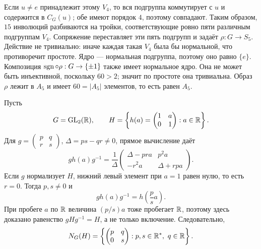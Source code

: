 Если $u\ne e$ принадлежит этому $V_4$, то вся подгруппа
коммутирует с $u$ и содержится в $C_G(u)$; обе имеют порядок $4$,
поэтому совпадают.
Таким образом, $15$ инволюций разбиваются на тройки,
соответствующие ровно пяти различным подгруппам $V_4$.
Сопряжение переставляет эти пять подгрупп и задаёт $\rho:G\to S_5$.
Действие не тривиально: иначе каждая такая $V_4$ была бы нормальной,
что противоречит простоте. Ядро --- нормальная подгруппа,
поэтому оно равно $\{e\}$.
Композиция $\operatorname{sgn}\circ\rho:G\to\{\pm1\}$ также имеет нормальное ядро.
Она не может быть инъективной, поскольку $60>2$;
значит по простоте она тривиальна. Образ $\rho$ лежит в $A_5$
и имеет $60=|A_5|$ элементов, то есть равен $A_5$.


Пусть
\[G=\operatorname{GL}_2(\mathbb{R}),\qquad
 H=\left\{h(a)=\begin{pmatrix}1&a\\0&1\end{pmatrix}:a\in\mathbb{R}\right\}.
\]
Для $g=\left(\begin{smallmatrix}p&q\\r&s\end{smallmatrix}\right)$,
$\Delta=ps-qr\ne0$, прямое вычисление даёт
\[
 gh(a)g^{-1}=\frac1\Delta
 \begin{pmatrix}\Delta-pra&p^2a\\-r^2a&\Delta+rpa\end{pmatrix}.
\]
Если $g$ нормализует $H$, нижний левый элемент при $a=1$ равен нулю,
то есть $r=0$. Тогда $p,s\ne0$ и
\[gh(a)g^{-1}=h\left(\frac ps a\right).\]
При пробеге $a$ по $\mathbb{R}$ величина $(p/s)a$ тоже пробегает $\mathbb{R}$,
поэтому здесь доказано равенство $gHg^{-1}=H$, а не только включение.
Следовательно,
\[N_G(H)=\left\{\begin{pmatrix}p&q\\0&s\end{pmatrix}:
 p,s\in\mathbb{R}^*,\ q\in\mathbb{R}\right\}.\]

